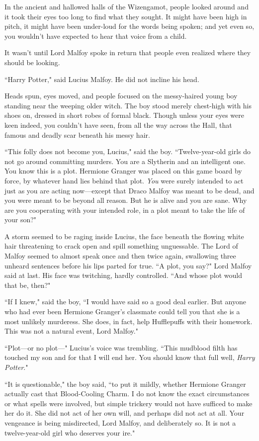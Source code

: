 In the ancient and hallowed halls of the Wizengamot, people looked around and it took their eyes too long to find what they sought. It might have been high in pitch, it might have been under-loud for the words being spoken; and yet even so, you wouldn't have expected to hear that voice from a child.

It wasn't until Lord Malfoy spoke in return that people even realized where they should be looking.

``Harry Potter," said Lucius Malfoy. He did not incline his head.

Heads spun, eyes moved, and people focused on the messy-haired young boy standing near the weeping older witch. The boy stood merely chest-high with his shoes on, dressed in short robes of formal black. Though unless your eyes were keen indeed, you couldn't have seen, from all the way across the Hall, that famous and deadly scar beneath his messy hair.

``This folly does not become you, Lucius," said the boy. ``Twelve-year-old girls do not go around committing murders. You are a Slytherin and an intelligent one. You know this is a plot. Hermione Granger was placed on this game board by force, by whatever hand lies behind that plot. \emph{You} were surely intended to act just as you are acting now—except that Draco Malfoy was meant to be dead, and you were meant to be beyond all reason. But he is alive and you are sane. Why are you cooperating with your intended role, in a plot meant to take the life of your son?"

A storm seemed to be raging inside Lucius, the face beneath the flowing white hair threatening to crack open and spill something unguessable. The Lord of Malfoy seemed to almost speak once and then twice again, swallowing three unheard sentences before his lips parted for true. ``A plot, you say?" Lord Malfoy said at last. His face was twitching, hardly controlled. ``And whose plot would that be, then?"

``If I knew," said the boy, ``I would have said so a good deal earlier. But anyone who had ever been Hermione Granger's classmate could tell you that she is a most unlikely murderess. She does, in fact, help Hufflepuffs with their homework. This was not a natural event, Lord Malfoy."

``Plot—or no plot—" Lucius's voice was trembling. ``This mudblood filth has touched my son and for that I will end her. You should know that full well, \emph{Harry Potter}."

``It is questionable," the boy said, ``to put it mildly, whether Hermione Granger actually cast that Blood-Cooling Charm. I do not know the exact circumstances or what spells were involved, but simple trickery would not have sufficed to make her do it. She did not act of her own will, and perhaps did not act at all. Your vengeance is being misdirected, Lord Malfoy, and deliberately so. It is not a twelve-year-old girl who deserves your ire."

